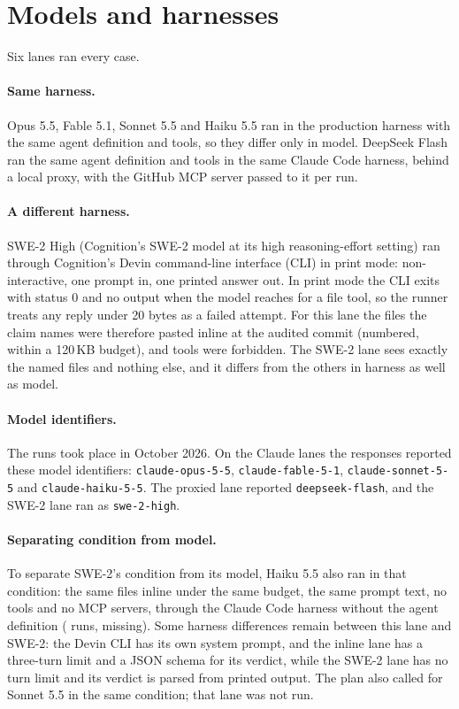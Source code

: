 \documentclass[11pt]{article}
\begin{document}
\section{Models and harnesses}
\label{sec:lanes}

Six lanes ran every case.

\paragraph{Same harness.} Opus 5.5, Fable 5.1, Sonnet 5.5 and Haiku 5.5 ran in the production harness with the same agent definition and tools, so they differ only in model. DeepSeek Flash ran the same agent definition and tools in the same Claude Code harness, behind a local proxy, with the GitHub MCP server passed to it per run.

\paragraph{A different harness.} SWE-2 High (Cognition's SWE-2 model at its high reasoning-effort setting) ran through Cognition's Devin command-line interface (CLI) in print mode: non-interactive, one prompt in, one printed answer out. In print mode the CLI exits with status 0 and no output when the model reaches for a file tool, so the runner treats any reply under 20 bytes as a failed attempt. For this lane the files the claim names were therefore pasted inline at the audited commit (numbered, within a 120\,KB budget), and tools were forbidden. The SWE-2 lane sees exactly the named files and nothing else, and it differs from the others in harness as well as model.

\paragraph{Model identifiers.} The runs took place in October 2026. On the Claude lanes the responses reported these model identifiers:
\texttt{claude-opus-5-5}, \texttt{claude-fable-5-1}, \texttt{claude-sonnet-5-5} and \texttt{claude-haiku-5-5}.
The proxied lane reported \texttt{deepseek-flash}, and the SWE-2 lane ran as \texttt{swe-2-high}.

\paragraph{Separating condition from model.} To separate SWE-2's condition from its model, Haiku 5.5 also ran in that condition: the same files inline under the same budget, the same prompt text, no tools and no MCP servers, through the Claude Code harness without the agent definition ( runs,  missing). Some harness differences remain between this lane and SWE-2: the Devin CLI has its own system prompt, and the inline lane has a three-turn limit and a JSON schema for its verdict, while the SWE-2 lane has no turn limit and its verdict is parsed from printed output. The plan also called for Sonnet 5.5 in the same condition; that lane was not run.
\end{document}
